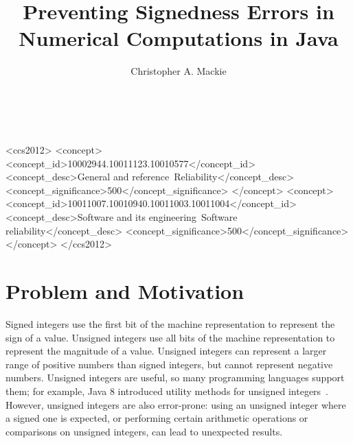 \documentclass{sig-alternate-05-2015}
\begin{document}
\toappear{}

\setlength{\pdfpageheight}{\paperheight}
\setlength{\pdfpagewidth}{\paperwidth}

\title{Preventing Signedness Errors in Numerical Computations in Java}

\author{
Christopher A. Mackie\\
       \\
       \\
}

\maketitle

\begin{CCSXML}
<ccs2012>
<concept>
<concept_id>10002944.10011123.10010577</concept_id>
<concept_desc>General and reference~Reliability</concept_desc>
<concept_significance>500</concept_significance>
</concept>
<concept>
<concept_id>10011007.10010940.10011003.10011004</concept_id>
<concept_desc>Software and its engineering~Software reliability</concept_desc>
<concept_significance>500</concept_significance>
</concept>
</ccs2012>
\end{CCSXML}


\printccsdesc


\section{Problem and Motivation}

Signed integers use the first bit of the machine representation to
represent the sign of a value.  Unsigned integers use all
bits of the machine representation to represent the magnitude of a value.
Unsigned integers can
represent a larger range of positive numbers than signed integers, but
cannot represent negative numbers.
Unsigned integers are useful, so many programming languages support them;
for example, Java 8 introduced utility methods for unsigned
integers~\cite{JDK8UnsignedIntegerArithmetic2012}.  However, unsigned
integers are also
error-prone:  using an unsigned integer where a signed
one is expected, or performing certain arithmetic operations or
comparisons on unsigned integers, can lead to unexpected results.
\end{document}
